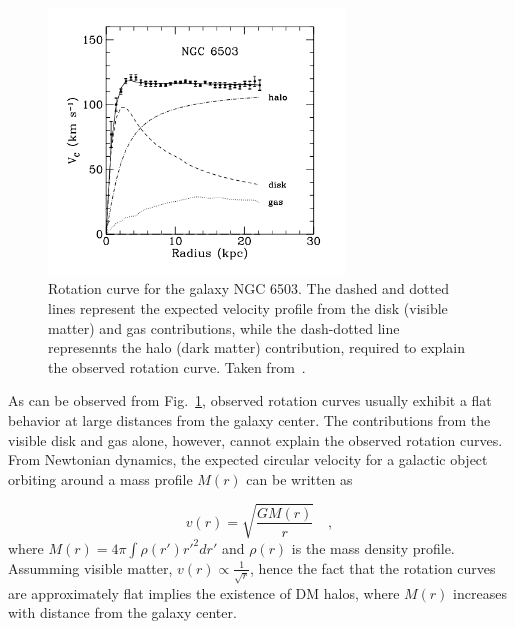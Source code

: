\begin{figure}[htbp]
    \centering
    \includegraphics[width=0.7\textwidth]{galaxy_rot_curve.png}
    \caption{Rotation curve for the galaxy NGC 6503. The dashed and dotted lines represent the expected velocity profile
    from the disk (visible matter) and gas contributions, while the dash-dotted line represennts the halo (dark matter)
    contribution, required to explain the observed rotation curve. Taken from~\cite{Bertone:2004pz}.}
    \label{fig:galaxy_rot_curve}
\end{figure}

As can be observed from Fig.~\ref{fig:galaxy_rot_curve}, observed rotation curves usually exhibit a flat behavior at
large distances from the galaxy center. The contributions from the visible
disk and gas alone, however, cannot explain the observed rotation curves. 
From Newtonian dynamics, the expected circular velocity for a galactic object orbiting around a mass profile $M(r)$ 
can be written as

\begin{equation}
    v(r) = \sqrt{\frac{G M(r)}{r}} \quad ,
\end{equation}
where $M(r) = 4\pi \int \rho(r') r'^{2} dr'$ and $\rho(r)$ is the mass density profile. Assumming visible matter, $v(r) \propto \frac{1}{\sqrt{r}}$,
hence the fact that the rotation curves are approximately flat implies the existence of DM halos, where $M(r)$ increases with distance
from the galaxy center.

